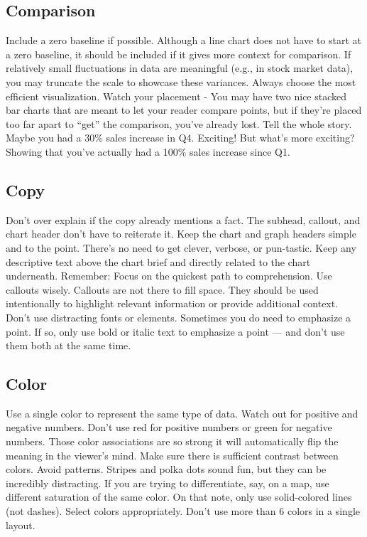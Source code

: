 \documentclass[]{book}
\theoremstyle{definition}
\theoremstyle{definition}
\theoremstyle{definition}
\theoremstyle{remark}
\begin{document}
\subsection{Comparison}\label{comparison}

Include a zero baseline if possible. Although a line chart does not have
to start at a zero baseline, it should be included if it gives more
context for comparison. If relatively small fluctuations in data are
meaningful (e.g., in stock market data), you may truncate the scale to
showcase these variances. Always choose the most efficient
visualization. Watch your placement - You may have two nice stacked bar
charts that are meant to let your reader compare points, but if they're
placed too far apart to ``get'' the comparison, you've already lost.
Tell the whole story. Maybe you had a 30\% sales increase in Q4.
Exciting! But what's more exciting? Showing that you've actually had a
100\% sales increase since Q1.

\subsection{Copy}\label{copy}

Don't over explain if the copy already mentions a fact. The subhead,
callout, and chart header don't have to reiterate it. Keep the chart and
graph headers simple and to the point. There's no need to get clever,
verbose, or pun-tastic. Keep any descriptive text above the chart brief
and directly related to the chart underneath. Remember: Focus on the
quickest path to comprehension. Use callouts wisely. Callouts are not
there to fill space. They should be used intentionally to highlight
relevant information or provide additional context. Don't use
distracting fonts or elements. Sometimes you do need to emphasize a
point. If so, only use bold or italic text to emphasize a point --- and
don't use them both at the same time.

\subsection{Color}\label{color}

Use a single color to represent the same type of data. Watch out for
positive and negative numbers. Don't use red for positive numbers or
green for negative numbers. Those color associations are so strong it
will automatically flip the meaning in the viewer's mind. Make sure
there is sufficient contrast between colors. Avoid patterns. Stripes and
polka dots sound fun, but they can be incredibly distracting. If you are
trying to differentiate, say, on a map, use different saturation of the
same color. On that note, only use solid-colored lines (not dashes).
Select colors appropriately. Don't use more than 6 colors in a single
layout.
\end{document}
